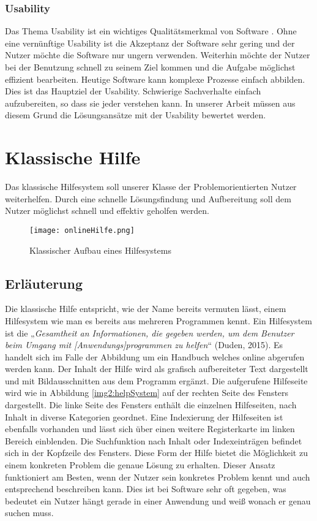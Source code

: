 \subsubsection{Usability}
Das Thema Usability ist ein wichtiges Qualitätsmerkmal von Software \cite{usability}. Ohne eine vernünftige Usability ist die Akzeptanz der Software sehr gering und der Nutzer möchte die Software nur ungern verwenden. Weiterhin möchte der Nutzer bei der Benutzung schnell zu seinem Ziel kommen und die Aufgabe möglichst effizient bearbeiten. Heutige Software kann komplexe Prozesse einfach abbilden. Dies ist das Hauptziel der Usability. Schwierige Sachverhalte einfach aufzubereiten, so dass sie jeder verstehen kann. In unserer Arbeit müssen aus diesem Grund die Lösungsansätze mit der Usability bewertet werden.

\section{Klassische Hilfe}
Das klassische Hilfesystem soll unserer Klasse der Problemorientierten Nutzer weiterhelfen. Durch eine schnelle Lösungsfindung und Aufbereitung soll dem Nutzer möglichst schnell und effektiv geholfen werden. 

\begin{figure}[ht]
\begin{center}
\texttt{[image: onlineHilfe.png]}
\caption{Klassischer Aufbau eines Hilfesystems}
\label{img1:userRoles}
\end{center}
\end{figure} 
\subsection{Erläuterung}
Die klassische Hilfe entspricht, wie der Name bereits vermuten lässt, einem Hilfesystem wie man es bereits aus mehreren Programmen kennt. Ein Hilfesystem ist die „\textit{Gesamtheit an Informationen, die gegeben werden, um dem Benutzer beim Umgang mit [Anwendungs]programmen zu helfen}“ (Duden, 2015). Es handelt sich im Falle der Abbildung um ein Handbuch welches online abgerufen werden kann. Der Inhalt der Hilfe wird als grafisch aufbereiteter Text dargestellt und mit Bildausschnitten aus dem Programm ergänzt. Die aufgerufene Hilfeseite wird wie in Abbildung \ref{img2:helpSystem} auf der rechten Seite des Fensters dargestellt. Die linke Seite des Fensters enthält die einzelnen Hilfeseiten, nach Inhalt in diverse Kategorien geordnet. Eine Indexierung der Hilfeseiten ist ebenfalls vorhanden und lässt sich über einen weitere Registerkarte im linken Bereich einblenden. Die Suchfunktion nach Inhalt oder Indexeinträgen befindet sich in der Kopfzeile des Fensters. Diese Form der Hilfe bietet die Möglichkeit zu einem konkreten Problem die genaue Lösung zu erhalten. Dieser Ansatz funktioniert am Besten, wenn der Nutzer sein konkretes Problem kennt und auch entsprechend beschreiben kann. Dies ist bei Software sehr oft gegeben, was bedeutet ein Nutzer hängt gerade in einer Anwendung und weiß wonach er genau suchen muss.

